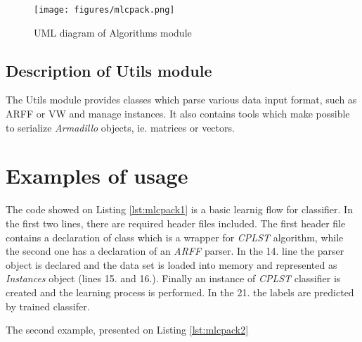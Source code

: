 \begin{figure}
\centering
\label{fig:alg_sh}
\caption{UML diagram of Algorithms module}
\texttt{[image: figures/mlcpack.png]}
\end{figure}

\subsection{Description of Utils module}

The Utils module provides classes which parse various data input format, such as ARFF or VW and manage instances. It also contains tools which make possible to serialize \textit{Armadillo} objects, ie. matrices or vectors.   

\section{Examples of usage}

The code showed on Listing \ref{lst:mlcpack1} is a basic learnig flow for classifier. In the first two lines, there are required header files included. The first header file contains a declaration of class which is a wrapper for \textit{CPLST} algorithm, while the second one has a declaration of an \textit{ARFF} parser. In the 14. line the parser object is declared and the data set is loaded into memory and represented as \textit{Instances} object (lines 15. and 16.). Finally an instance of \textit{CPLST} classifier is created and the learning process is performed. In the 21. the labels are predicted by trained classifer.



The second example, presented on Listing \ref{lst:mlcpack2}  



